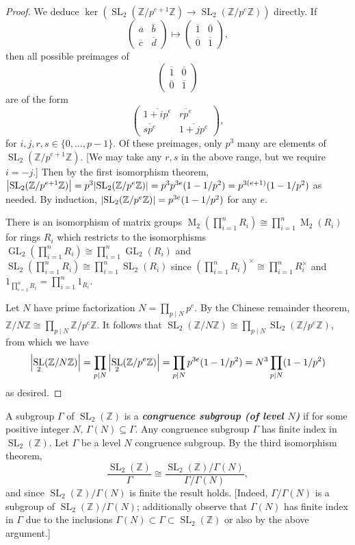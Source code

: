 \documentclass[10pt,leqno]{article}
\newcommand{\textib}[1]{\textbf{\textit{#1}}}
\DeclareMathOperator{\Mat}{M}
\DeclareMathOperator{\GL}{GL}
\DeclareMathOperator{\SL}{SL}
\begin{document}
\begin{proof}
    We deduce $\ker(\SL_2(\mathbb{Z}/p^{e+1}\mathbb{Z})\to \SL_2(\mathbb{Z}/p^e\mathbb{Z}))$ directly. If \[\begin{pmatrix}
        \overline a & \overline b \\ \overline c & \overline d
    \end{pmatrix}\mapsto \begin{pmatrix}
        \overline 1 & \overline 0 \\ \overline 0 & \overline 1
    \end{pmatrix},\] then all possible preimages of \[\begin{pmatrix}
        \overline 1 & \overline 0 \\ \overline 0 & \overline 1
    \end{pmatrix}\] are of the form \[\begin{pmatrix}
        \overline{1+ip^e} & \overline{rp^e} \\ \overline{sp^e} & \overline{1+jp^e}
    \end{pmatrix},\] for $i,j,r,s\in \{0,\dots,p-1\}$. Of these preimages, only $p^3$ many are elements of $\SL_2(\mathbb{Z}/p^{e+1}\mathbb{Z})$. [We may take any $r,s$ in the above range, but we require $i=-j$.] Then by the first isomorphism theorem, $\abs{\SL_2(\mathbb{Z}/p^{e+1}\mathbb{Z})} = p^3\abs{\SL_2(\mathbb{Z}/p^e\mathbb{Z})} = p^3p^{3e}(1-1/p^2) = p^{3(e+1)}(1-1/p^2)$ as needed. By induction, $\abs{\SL_2(\mathbb{Z}/p^e\mathbb{Z})} = p^{3e}(1-1/p^2)$ for any $e$.

    There is an isomorphism of matrix groups $\Mat_2(\prod_{i=1}^nR_i)\cong \prod_{i=1}^n\Mat_2(R_i)$ for rings $R_i$ which restricts to the isomorphisms $\GL_2(\prod_{i=1}^nR_i)\cong \prod_{i=1}^n\GL_2(R_i)$ and $\SL_2(\prod_{i=1}^nR_i)\cong \prod_{i=1}^n\SL_2(R_i)$ since $(\prod_{i=1}^nR_i)^\times\cong \prod_{i=1}^nR_i^\times$ and $1_{\prod_{i=1}^nR_i} = \prod_{i=1}^n1_{R_i}$.

    Let $N$ have prime factorization $N = \prod_{p\mid N} p^{e}$. By the Chinese remainder theorem, $\mathbb{Z}/N\mathbb{Z}\cong \prod_{p\mid N}\mathbb{Z}/p^{e}\mathbb{Z}$. It follows that $\SL_2(\mathbb{Z}/N\mathbb{Z})\cong \prod_{p\mid N}\SL_2(\mathbb{Z}/p^{e}\mathbb{Z})$, from which we have \[\abs{\SL_2(\mathbb{Z}/N\mathbb{Z})}= \prod_{p\mid N}\abs{\SL_2(\mathbb{Z}/p^{e}\mathbb{Z})} = \prod_{p\mid N}p^{3e}(1-1/p^2) = N^3\prod_{p\mid N}(1-1/p^2)\] as desired.
\end{proof}

A subgroup $\varGamma$ of $\SL_2(\mathbb{Z})$ is a \textib{congruence subgroup (of level $N$)} if for some positive integer $N$, $\varGamma(N)\subseteq \varGamma$. Any congruence subgroup $\varGamma$ has finite index in $\SL_2(\mathbb{Z})$. Let $\varGamma$ be a level $N$ congruence subgroup. By the third isomorphism theorem,
\[\frac{\SL_2(\mathbb{Z})}{\varGamma}\cong \frac{\SL_2(\mathbb{Z})/\varGamma(N)}{\varGamma/\varGamma(N)},\] and since $\SL_2(\mathbb{Z})/\varGamma(N)$ is finite the result holds. [Indeed, $\varGamma/\varGamma(N)$ is a subgroup of $\SL_2(\mathbb{Z})/\varGamma(N)$; additionally observe that $\varGamma(N)$ has finite index in $\varGamma$ due to the inclusions $\varGamma(N)\subset \varGamma \subset \SL_2(\mathbb{Z})$ or also by the above argument.]
\end{document}
